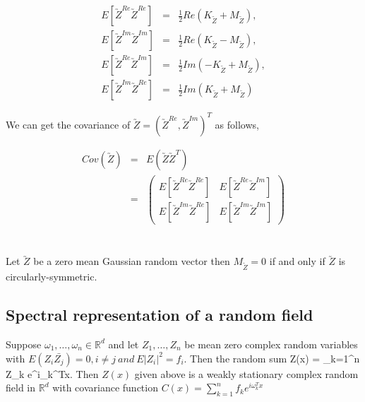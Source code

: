 \begin{eqnarray}
	E[\utilde{Z}^{Re}\utilde{Z}^{Re}] &=& \frac{1}{2}Re(K_{\utilde{Z}} + M_{\utilde{Z}}), \nonumber\\
	E[\utilde{Z}^{Im}\utilde{Z}^{Im}] &=& \frac{1}{2}Re(K_{\utilde{Z}} - M_{\utilde{Z}}), \nonumber\\
	E[\utilde{Z}^{Re}\utilde{Z}^{Im}] &=& \frac{1}{2}Im(-K_{\utilde{Z}} + M_{\utilde{Z}}), \nonumber\\
	E[\utilde{Z}^{Im}\utilde{Z}^{Re}] &=& \frac{1}{2}Im(K_{\utilde{Z}} + M_{\utilde{Z}}) \label{comlex_cov}
\end{eqnarray}

We can get the covariance of $\utilde{Z}=(\utilde{Z}^{Re}, \utilde{Z}^{Im})^T$ as follows,

\begin{eqnarray*}
	Cov(\utilde{Z}) &=& E(\utilde{Z}\utilde{Z}^T) \\
	&=& \left( \begin{array}{ll}
	E[\utilde{Z}^{Re}\utilde{Z}^{Re}] &  E[\utilde{Z}^{Re}\utilde{Z}^{Im}] \\
	E[\utilde{Z}^{Im}\utilde{Z}^{Re}] &  E[\utilde{Z}^{Im}\utilde{Z}^{Im}]
	\end{array}
	\right) \\
\end{eqnarray*}

\begin{thm}[Gallager, 2008] \label{circular_theory} \hfill \\
	Let $\utilde{Z}$ be a zero mean Gaussian random vector then $M_{\utilde{Z}}=0$ if and only if $\utilde{Z}$ is circularly-symmetric.
\end{thm}


\subsection{Spectral representation of a random field}

Suppose $\omega_1,\ldots, \omega_n \in \mathbb{R}^d$ and let $Z_1, \ldots, Z_n$ be mean zero complex random variables with  $E(Z_i\bar{Z_j})=0, i\ne j\ and\ E|Z_i|^2=f_i$. Then the random sum
\beq Z(x) = \sum_{k=1}^n Z_k e^{i\omega_k^Tx}.\eeq
Then $Z(x)$ given above is a weakly stationary complex random field in $\mathbb{R}^d$ with covariance function $C(x) = \sum_{k=1}^n f_k e^{i\omega_k^Tx}$\\

